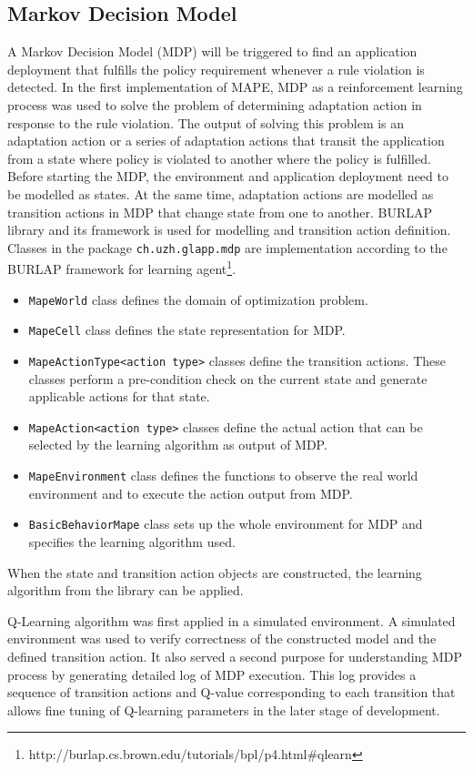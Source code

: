 \documentclass{seal_thesis}
\begin{document}
\subsection{Markov Decision Model}\label{sec:mdp}
A Markov Decision Model (MDP) will be triggered to find an application deployment that fulfills the policy requirement whenever a rule violation is detected.
In the first implementation of MAPE, MDP as a reinforcement learning process was used to solve the problem of determining adaptation action in response to the rule violation.
The output of solving this problem is an adaptation action or a series of adaptation actions that transit the application from a state where policy is violated to another where the policy is fulfilled.
Before starting the MDP, the environment and application deployment need to be modelled as states.
At the same time, adaptation actions are modelled as transition actions in MDP that change state from one to another.
BURLAP library and its framework is used for modelling and transition action definition.
Classes in the package \texttt{ch.uzh.glapp.mdp} are implementation according to the BURLAP framework for learning agent\footnote{http://burlap.cs.brown.edu/tutorials/bpl/p4.html\#qlearn}.
\begin{itemize}
\item \texttt{MapeWorld} class defines the domain of optimization problem.
\item \texttt{MapeCell} class defines the state representation for MDP.
\item \texttt{MapeActionType<action type>} classes define the transition actions.
These classes perform a pre-condition check on the current state and generate applicable actions for that state.
\item \texttt{MapeAction<action type>} classes define the actual action that can be selected by the learning algorithm as output of MDP.
\item \texttt{MapeEnvironment} class defines the functions to observe the real world environment and to execute the action output from MDP.
\item \texttt{BasicBehaviorMape} class sets up the whole environment for MDP and specifies the learning algorithm used.
\end{itemize}
When the state and transition action objects are constructed, the learning algorithm from the library can be applied.

Q-Learning algorithm was first applied in a simulated environment.
A simulated environment was used to verify correctness of the constructed model and the defined transition action.
It also served a second purpose for understanding MDP process by generating detailed log of MDP execution.
This log provides a sequence of transition actions and Q-value corresponding to each transition that allows fine tuning of Q-learning parameters in the later stage of development.
\end{document}
